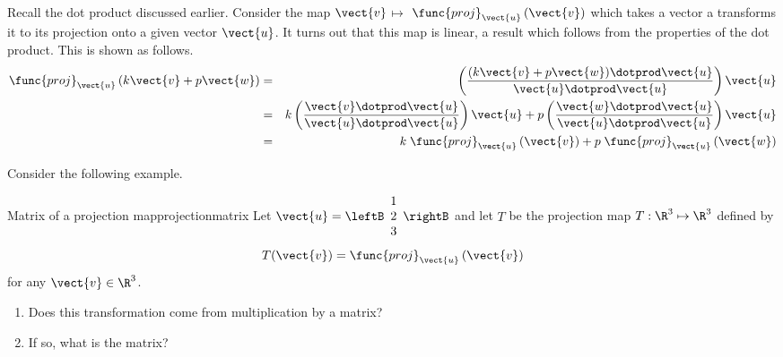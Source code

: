 Recall the dot product discussed earlier. Consider the map $\vect{v}$\textbf{$\mapsto $}
$\func{proj}_{\vect{u}}\left( \vect{v}\right) $ which takes a vector a transforms it to its projection onto a given vector $\vect{u}$. It turns out that
this map is linear, a result which follows from the properties of the
dot product. This is shown as follows.
\begin{eqnarray*}
\func{proj}_{\vect{u}}\left( k \vect{v}+ p \vect{w}\right)
&=&\left( \vspace{0.05in}\frac{(k \vect{v}+ p \vect{w})\dotprod \vect{u}}{
\vect{u}\dotprod \vect{u}}\right) \vect{u} \\
&=& k  \left( \vspace{0.05in}\frac{
\vect{v}\dotprod \vect{u}}{\vect{u}\dotprod \vect{u}}\right) \vect{u}+p \left( \vspace{
0.05in}\frac{\vect{w}\dotprod \vect{u}}{\vect{u}\dotprod \vect{u}}\right) \vect{u} \\
&=& k \; \func{proj}_{\vect{u}}\left( \vect{v}\right) +p \; \func{proj}
_{\vect{u}}\left( \vect{w}\right) 
\end{eqnarray*}

Consider the following example.

\begin{example}{Matrix of a projection map}{projectionmatrix}
Let $\vect{u} = \leftB \begin{array}{r}
1 \\
2 \\
3
\end{array}
\rightB$ and let $T$ be the projection map $T: \R^3 \mapsto \R^3$ defined by 
\[
T(\vect{v}) = \func{proj}_{\vect{u}}\left( \vect{v}\right)
\]
for any $\vect{v} \in \R^3$.  
\begin{enumerate}
\item Does this transformation come from
multiplication by a matrix?
\item If so, what is the matrix?
\end{enumerate}
\end{example}

